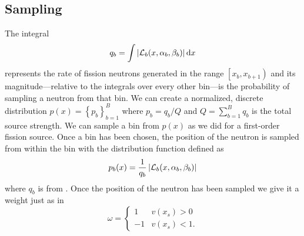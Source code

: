 \subsection{Sampling} \label{sec:SecondOrderSample}
The integral 
\begin{equation}
    q_b = \int \left|\mathcal{L}_b(x, \alpha_b, \beta_b)\right| \mathop{}\!\mathrm{d} x 
    \label{eq:IntegratedSourceBin}
\end{equation}
represents the rate of fission neutrons generated in the range $\left[x_b, x_{b+1}\right)$ and its magnitude---relative to the integrals over every other bin---is the probability of sampling a neutron from that bin.  We can create a normalized, discrete distribution $p(x) = \left\{p_b\right\}_{b=1}^B$ where $p_b = q_b/Q$ and $Q = \sum_{b=1}^B q_b$ is the total source strength.  We can sample a bin from $p(x)$ as we did for a first-order fission source.  Once a bin has been chosen, the position of the neutron is sampled from within the bin with the distribution function defined as
\begin{equation}
    p_b(x) = \frac{1}{q_b} \left|\mathcal{L}_b(x, \alpha_b, \beta_b)\right|
    \label{eq:BinPDF}
\end{equation}
where $q_b$ is from .  Once the position of the neutron has been sampled we give it a weight just as in 
\begin{equation}
    \omega = \begin{cases}
        1 & v(x_s) > 0 \\
        -1 & v(x_s) < 1.
    \end{cases}
    \label{eq:SecondOrderInitialWeight}
\end{equation}

